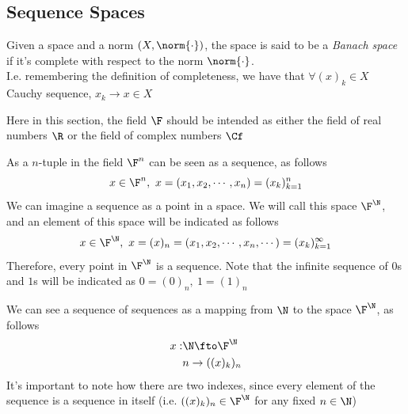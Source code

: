 \documentclass[../mmf.tex]{subfiles}
\begin{document}
\subsection{Sequence Spaces}
\begin{dfn}
	Given a space and a norm $(X,\norm{\cdot})$, the space is said to be a \textit{Banach space} if it's complete with respect to the norm $\norm{\cdot}$.\\
	I.e. remembering the definition of completeness, we have that $\forall(x)_k\in X$ Cauchy sequence, $x_k\to x\in X$
\end{dfn}
\begin{ntn}
	Here in this section, the field $\F$ should be intended as either the field of real numbers $\R$ or the field of complex numbers $\Cf$
\end{ntn}
\begin{dfn}
	As a $n$-tuple in the field $\F^n$ can be seen as a sequence, as follows
	\begin{equation*}
		x\in\F^n,\ x=(x_1,x_2,\cdots,x_n)=(x_k)_{k=1}^n
	\end{equation*}
	We can imagine a sequence as a point in a space. We will call this space $\F^{\N}$, and an element of this space will be indicated as follows
	\begin{equation*}
		x\in\F^{\N},\ x=(x)_n=(x_1,x_2,\cdots,x_n,\cdots)=(x_k)_{k=1}^\infty
	\end{equation*}
	Therefore, every point in $\F^{\N}$ is a sequence. Note that the infinite sequence of $0$s and $1$s will be indicated as $0=(0)_n,\ 1=(1)_n$
\end{dfn}
\begin{dfn}
	We can see a sequence of sequences as a mapping from $\N$ to the space $\F^{\N}$, as follows
	\begin{equation*}
		\begin{aligned}
			x:&\N\fto\F^{\N}\\
			&n\to((x)_k)_n
		\end{aligned}
	\end{equation*}
	It's important to note how there are two indexes, since every element of the sequence is a sequence in itself (i.e. $((x)_k)_n\in\F^{\N}$ for any fixed $n\in\N$)
\end{dfn}
\end{document}
